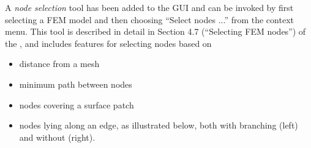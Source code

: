 \documentclass{article}
\begin{document}
A {\it node selection} tool has been added to the GUI and can be
invoked by first selecting a FEM model and then choosing {\sf ``Select
nodes ...''} from the context menu.  This tool is described in detail
in Section 4.7 (``Selecting FEM nodes'') of the
, and includes features
for selecting nodes based on

\begin{itemize}

\item distance from a mesh

\item minimum path between nodes

\item nodes covering a surface patch

\item nodes lying along an edge, as illustrated below, both with
branching (left) and without (right).

\end{itemize}
\end{document}
